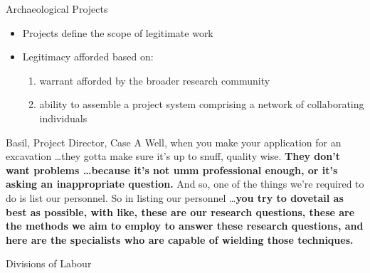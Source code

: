 \documentclass{beamer}
\begin{document}
\begin{frame}{Archaeological Projects}
  \begin{itemize}
    \item Projects define the scope of legitimate work
    \item Legitimacy afforded based on:
    \begin{enumerate}
      \item warrant afforded by the broader research community
      \item ability to assemble a project system comprising a network of collaborating individuals
    \end{enumerate}
  \end{itemize}

\begin{block}{Basil, Project Director, Case A}
Well, when you make your application for an excavation \dots they gotta make sure it’s up to snuff, quality wise. \textbf{They don’t want problems \dots because it’s not umm professional enough, or it’s asking an inappropriate question.} And so, one of the things we’re required to do is list our personnel. So in listing our personnel \dots \alert{\textbf{you try to dovetail as best as possible, with like, these are our research questions, these are the methods we aim to employ to answer these research questions, and here are the specialists who are capable of wielding those techniques.}}
\end{block}

\end{frame}


\begin{frame}{Divisions of Labour}
  
  \centering

  {
  \setlength{\fboxsep}{0pt}
  \setlength{\fboxrule}{1pt}
  }

  {
  \setlength{\fboxsep}{0pt}
  \setlength{\fboxrule}{1pt}
  }

\end{frame}
\end{document}

